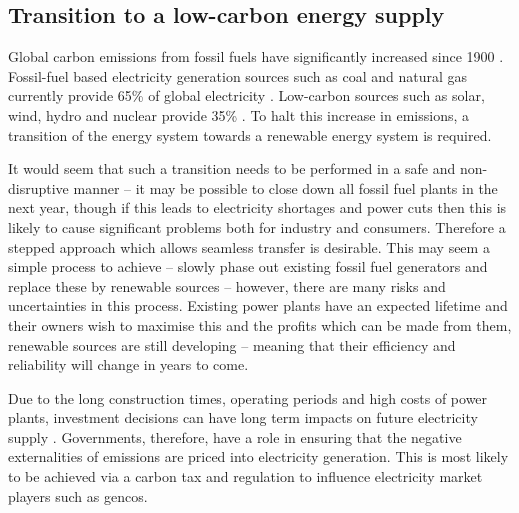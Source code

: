 \subsection{Transition to a low-carbon energy supply}

Global carbon emissions from fossil fuels have significantly increased since 1900 \cite{boden2017global}.    Fossil-fuel based electricity generation sources such as coal and natural gas currently provide 65\% of global electricity \cite{BP2018}. Low-carbon sources such as solar, wind, hydro and nuclear provide 35\% . To halt this increase in  emissions, a transition of the energy system towards a renewable energy system is required. 





It would seem that such a transition needs to be performed in a safe and non-disruptive manner -- it may be possible to close down all fossil fuel plants in the next year, though if this leads to electricity shortages and power cuts then this is likely to cause significant problems both for industry and consumers. Therefore a stepped approach which allows seamless transfer is desirable. This may seem a simple process to achieve -- slowly phase out existing fossil fuel generators and replace these by renewable sources -- however, there are many risks and uncertainties in this process. Existing power plants have an expected lifetime and their owners wish to maximise this and the profits which can be made from them, renewable sources are still developing -- meaning that their efficiency and reliability will change in years to come.

Due to the long construction times, operating periods and high costs of power plants, investment decisions can have long term impacts on future electricity supply \cite{Chappin2017}. Governments, therefore, have a role in ensuring that the negative externalities of emissions are priced into electricity generation. This is most likely to be achieved via a carbon tax and regulation to influence electricity market players such as \acrfull{gencos}.


